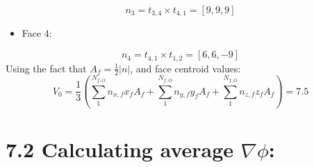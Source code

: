 \documentclass[11pt]{article}
\begin{document}
\[
n_{3} = t_{3,4} \times t_{4,1}= [9,9,9]
\]
\begin{itemize}
\item Face 4:
\end{itemize}
\[
n_{4} = t_{4,1} \times t_{1,2}= [6,6,-9]
\]
Using the fact that \(A_{f} = \frac{1}{2} |n|\), and face centroid values:
\[
V_{0}=\frac{1}{3} \left( \sum_{1}^{N_{f,O}} n_{x,f}x_{f}A_{f} + \sum_{1}^{N_{f,O}} n_{y,f}y_{f}A_{f} + \sum_{1}^{N_{f,O}} n_{z,f}z_{f}A_{f} \right) = 7.5
\]

\section{7.2 Calculating average \(\nabla \phi\):}
\label{sec:org9838576}
\end{document}
